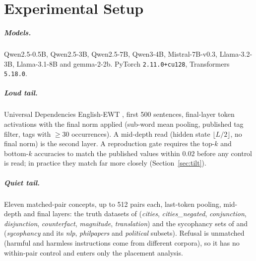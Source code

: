 \documentclass[11pt]{report}
\begin{document}
\chapter{Experimental Setup}

\paragraph{Models.} Qwen2.5-0.5B, Qwen2.5-3B, Qwen2.5-7B, Qwen3-4B,
Mistral-7B-v0.3, Llama-3.2-3B, Llama-3.1-8B and gemma-2-2b. PyTorch
\texttt{2.11.0+cu128}, Transformers \texttt{5.18.0}.

\paragraph{Loud tail.} Universal Dependencies English-EWT
\citep{silveira2014gold,nivre2020universal}, first 500 sentences,
final-layer token activations with the final norm applied (sub-word mean
pooling, published tag filter, tags with $\ge 30$ occurrences). A mid-depth read
(hidden state $\lfloor L/2 \rfloor$, no final norm) is the second layer. A
reproduction gate requires the top-$k$ and bottom-$k$ accuracies to match the
published values within $0.02$ before any control is read; in practice they
match far more closely (Section~\ref{sec:tilt}).

\paragraph{Quiet tail.} Eleven matched-pair concepts, up to 512 pairs each,
last-token pooling, mid-depth and final layers: the truth datasets of
\citet{marks2024geometry} (\textit{cities}, \textit{cities\_negated},
\textit{conjunction}, \textit{disjunction}, \textit{counterfact},
\textit{magnitude}, \textit{translation}) and the sycophancy sets of
\citet{panickssery2024steering} and \citet{perez2022discovering}
(\textit{sycophancy} and its \textit{nlp}, \textit{philpapers} and
\textit{political} subsets). Refusal is unmatched (harmful and harmless
instructions come from different corpora), so it has no within-pair control and
enters only the placement analysis.
\end{document}
